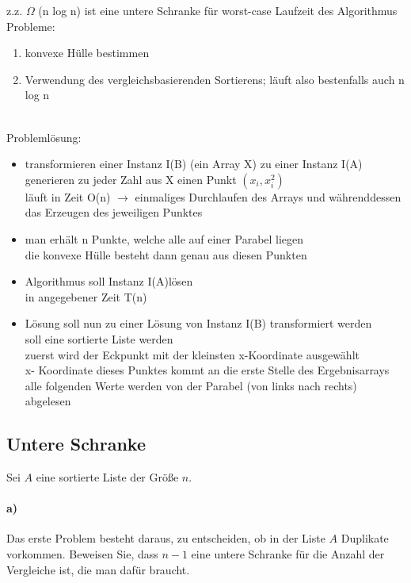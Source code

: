 \documentclass[paper=a4, fontsize=11pt]{scrartcl}
\numberwithin{equation}{section}
\numberwithin{figure}{section}
\numberwithin{table}{section}
\begin{document}
z.z. $\Omega$ (n log n) ist eine untere Schranke für worst-case Laufzeit des Algorithmus \\

Probleme:
\begin{enumerate}
\item konvexe Hülle bestimmen
\item Verwendung des vergleichsbasierenden Sortierens; läuft also bestenfalls auch n log n
\end{enumerate} \\

Problemlösung:
\begin{itemize}
\item transformieren einer Instanz I(B) (ein Array X) zu einer Instanz I(A)\\
generieren zu jeder Zahl aus X einen Punkt $(x_{i},x_{i}^{2})$ \\
läuft in Zeit O(n) $\rightarrow$ einmaliges Durchlaufen des Arrays und währenddessen das Erzeugen des jeweiligen Punktes 
\item man erhält n Punkte, welche alle auf einer Parabel liegen \\
die konvexe Hülle besteht dann genau aus diesen Punkten
\item Algorithmus soll Instanz I(A)lösen \\
in angegebener Zeit T(n)
\item Lösung soll nun zu einer Lösung von Instanz I(B) transformiert werden \\
soll eine sortierte Liste werden \\
zuerst wird der Eckpunkt mit der kleinsten x-Koordinate ausgewählt \\
x- Koordinate dieses Punktes kommt an die erste Stelle des Ergebnisarrays \\
alle folgenden Werte werden von der Parabel (von links nach rechts) abgelesen
\end{itemize}


\subsection{Untere Schranke}
Sei $A$ eine sortierte Liste der Größe $n$.

\paragraph{a)}
Das erste Problem besteht daraus, zu entscheiden, ob in der Liste $A$ Duplikate vorkommen.
Beweisen Sie, dass $n-1$ eine untere Schranke für die Anzahl der Vergleiche ist, die man dafür braucht. \\
\end{document}

